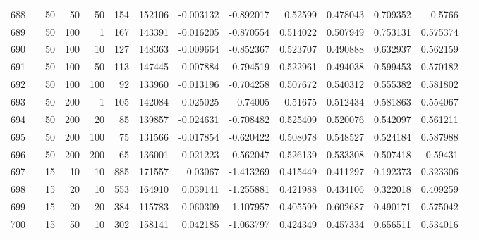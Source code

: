 \begin{longtable}{llrrrrrrrrrrrr}
		688 & &           50 &                50 &           50 &         154 &     152106 & -0.003132 & -0.892017 &   0.52599 &    0.478043 &       0.709352 &    0.5766 \\
		689 & &           50 &               100 &            1 &         167 &     143391 & -0.016205 & -0.870554 &  0.514022 &    0.507949 &       0.753131 &  0.575374 \\
		690 & &           50 &               100 &           10 &         127 &     148363 & -0.009664 & -0.852367 &  0.523707 &    0.490888 &       0.632937 &  0.562159 \\
		691 & &           50 &               100 &           50 &         113 &     147445 & -0.007884 & -0.794519 &  0.522961 &    0.494038 &       0.599453 &  0.570182 \\
		692 & &           50 &               100 &          100 &          92 &     133960 & -0.013196 & -0.704258 &  0.507672 &    0.540312 &       0.555382 &  0.581802 \\
		693 & &           50 &               200 &            1 &         105 &     142084 & -0.025025 &  -0.74005 &   0.51675 &    0.512434 &       0.581863 &  0.554067 \\
		694 & &           50 &               200 &           20 &          85 &     139857 & -0.024631 & -0.708482 &  0.525409 &    0.520076 &       0.542097 &  0.561211 \\
		695 & &           50 &               200 &          100 &          75 &     131566 & -0.017854 & -0.620422 &  0.508078 &    0.548527 &       0.524184 &  0.587988 \\
		696 & &           50 &               200 &          200 &          65 &     136001 & -0.021223 & -0.562047 &  0.526139 &    0.533308 &       0.507418 &   0.59431 \\\midrule
		697 & \multirow[t]{46}{*}{\rotatebox[origin=r]{90}{use-tf-idf-weighted}} &           15 &                10 &           10 &         885 &     171557 &   0.03067 & -1.413269 &  0.415449 &    0.411297 &       0.192373 &  0.323306 \\
		698 & &           15 &                20 &           10 &         553 &     164910 &  0.039141 & -1.255881 &  0.421988 &    0.434106 &       0.322018 &  0.409259 \\
		699 & &           15 &                20 &           20 &         384 &     115783 &  0.060309 & -1.107957 &  0.405599 &    0.602687 &       0.490171 &  0.575042 \\
		700 & &           15 &                50 &           10 &         302 &     158141 &  0.042185 & -1.063797 &  0.424349 &    0.457334 &       0.656511 &  0.534016 \\

\end{longtable}
